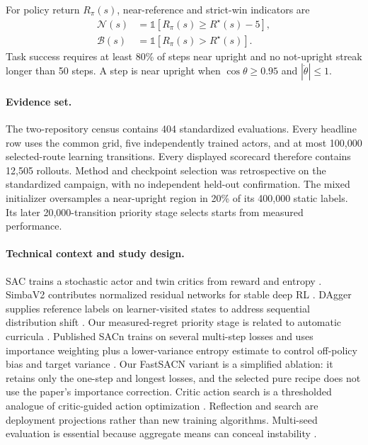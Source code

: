 For policy return $R_\pi(s)$, near-reference and strict-win indicators are
\[
\begin{aligned}
\mathcal N(s)&=\mathbb 1[R_\pi(s)\ge R^\star(s)-5],\\
\mathcal B(s)&=\mathbb 1[R_\pi(s)>R^\star(s)].
\end{aligned}
\]
Task success requires at least 80\% of steps near upright and no not-upright streak longer than 50 steps. A step is near upright when $\cos\theta\ge0.95$ and $|\dot\theta|\le1$.

\paragraph{Evidence set.}
The two-repository census contains 404 standardized evaluations. Every headline row uses the common grid, five independently trained actors, and at most 100,000 selected-route learning transitions. Every displayed scorecard therefore contains 12,505 rollouts. Method and checkpoint selection was retrospective on the standardized campaign, with no independent held-out confirmation. The mixed initializer oversamples a near-upright region in 20\% of its 400,000 static labels. Its later 20,000-transition priority stage selects starts from measured performance.

\paragraph{Technical context and study design.}
SAC trains a stochastic actor and twin critics from reward and entropy \cite{haarnoja2018sac}. SimbaV2 contributes normalized residual networks for stable deep RL \cite{lee2025simba}. DAgger supplies reference labels on learner-visited states to address sequential distribution shift \cite{ross2011dagger}. Our measured-regret priority stage is related to automatic curricula \cite{jiang2021plr}. Published SACn trains on several multi-step losses and uses importance weighting plus a lower-variance entropy estimate to control off-policy bias and target variance \cite{lyskawa2025sacn}. Our FastSACN variant is a simplified ablation: it retains only the one-step and longest losses, and the selected pure recipe does not use the paper's importance correction. Critic action search is a thresholded analogue of critic-guided action optimization \cite{kalashnikov2018qtopt}. Reflection and search are deployment projections rather than new training algorithms. Multi-seed evaluation is essential because aggregate means can conceal instability \cite{henderson2018matters,agarwal2021precipice}.

